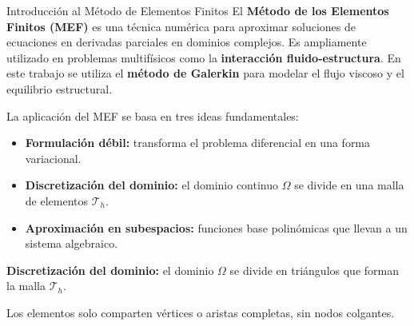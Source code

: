 \begin{frame}[allowframebreaks]{Introducción al Método de Elementos Finitos}
El \textbf{Método de los Elementos Finitos (MEF)} es una técnica numérica para aproximar soluciones de ecuaciones en derivadas parciales en dominios complejos.  
Es ampliamente utilizado en problemas multifísicos como la \textbf{interacción fluido-estructura}.  
En este trabajo se utiliza el \textbf{método de Galerkin} para modelar el flujo viscoso y el equilibrio estructural.

\vspace{0.3cm}

La aplicación del MEF se basa en tres ideas fundamentales:

\begin{itemize}
    \item \textbf{Formulación débil:} transforma el problema diferencial en una forma variacional.
    \item \textbf{Discretización del dominio:} el dominio continuo $\Omega$ se divide en una malla de elementos $\mathcal{T}_h$.
    \item \textbf{Aproximación en subespacios:} funciones base polinómicas que llevan a un sistema algebraico.
\end{itemize}

\framebreak

\textbf{Discretización del dominio:} el dominio $\Omega$ se divide en triángulos que forman la malla $\mathcal{T}_h$.

\begin{center}
    \hspace{1.5cm}
\end{center}

{\small Los elementos solo comparten vértices o aristas completas, sin nodos colgantes.}

\end{frame}

